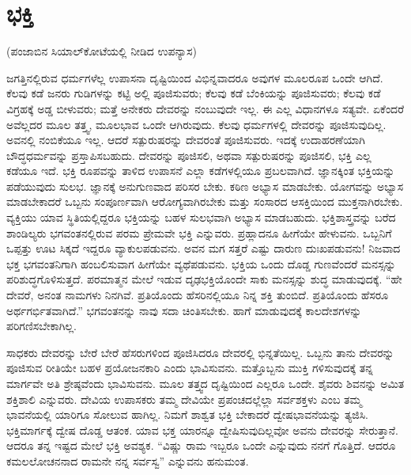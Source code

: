 
\chapter{ಭಕ್ತಿ}

\begin{center}
(ಪಂಜಾಬಿನ ಸಿಯಾಲ್​ಕೋಟೆಯಲ್ಲಿ ನೀಡಿದ ಉಪನ್ಯಾಸ)
\end{center}

ಜಗತ್ತಿನಲ್ಲಿರುವ ಧರ್ಮಗಳೆಲ್ಲ ಉಪಾಸನಾ ದೃಷ್ಟಿಯಿಂದ ವಿಭಿನ್ನವಾದರೂ ಅವುಗಳ ಮೂಲರೂಪ ಒಂದೇ ಆಗಿದೆ. ಕೆಲವು ಕಡೆ ಜನರು ಗುಡಿಗಳನ್ನು ಕಟ್ಟಿ ಅಲ್ಲಿ ಪೂಜಿಸುವರು; ಕೆಲವು ಕಡೆ ಬೆಂಕಿಯನ್ನು ಪೂಜಿಸುವರು; ಕೆಲವು ಕಡೆ ವಿಗ್ರಹಕ್ಕೆ ಅಡ್ಡ ಬೀಳುವರು; ಮತ್ತೆ ಅನೇಕರು ದೇವರನ್ನು ನಂಬುವುದೇ ಇಲ್ಲ. ಈ ಎಲ್ಲ ವಿಧಾನಗಳೂ ಸತ್ಯವೇ. ಏಕೆಂದರೆ ಅವೆಲ್ಲದರ ಮೂಲ ತತ್ತ್ವ, ಮೂಲಭಾವ ಒಂದೇ ಆಗಿರುವುದು. ಕೆಲವು ಧರ್ಮಗಳಲ್ಲಿ ದೇವರನ್ನು ಪೂಜಿಸುವುದಿಲ್ಲ. ಅವನಲ್ಲಿ ನಂಬಿಕೆಯೂ ಇಲ್ಲ. ಆದರೆ ಸತ್ಪುರುಷರನ್ನು ದೇವರಂತೆ ಪೂಜಿಸುವರು. ಇದಕ್ಕೆ ಉದಾಹರಣೆಯಾಗಿ ಬೌದ್ಧಧರ್ಮವನ್ನು ಪ್ರಸ್ತಾಪಿಸಬಹುದು. ದೇವರನ್ನು ಪೂಜಿಸಲಿ, ಅಥವಾ ಸತ್ಪುರುಷರನ್ನು ಪೂಜಿಸಲಿ, ಭಕ್ತಿ ಎಲ್ಲ ಕಡೆಯೂ ಇದೆ. ಭಕ್ತಿ ರೂಪವನ್ನು ತಾಳಿದ ಉಪಾಸನೆ ಎಲ್ಲಾ ಕಡೆಗಳಲ್ಲಿಯೂ ಪ್ರಬಲವಾಗಿದೆ. ಜ್ಞಾನಕ್ಕಿಂತ ಭಕ್ತಿಯನ್ನು ಪಡೆಯುವುದು ಸುಲಭ. ಜ್ಞಾನಕ್ಕೆ ಅನುಗುಣವಾದ ಪರಿಸರ ಬೇಕು. ಕಠಿಣ ಅಭ್ಯಾಸ ಮಾಡಬೇಕು. ಯೋಗವನ್ನು ಅಭ್ಯಾಸ ಮಾಡಬೇಕಾದರೆ ಒಬ್ಬನು ಸಂಪೂರ್ಣವಾಗಿ ಆರೋಗ್ಯವಾಗಿರಬೇಕು ಮತ್ತು ಸಂಸಾರದ ಆಸಕ್ತಿಯಿಂದ ಮುಕ್ತನಾಗಿರಬೇಕು. ವ್ಯಕ್ತಿಯು ಯಾವ ಸ್ಥಿತಿಯಲ್ಲಿದ್ದರೂ ಭಕ್ತಿಯನ್ನು ಬಹಳ ಸುಲಭವಾಗಿ ಅಭ್ಯಾಸ ಮಾಡಬಹುದು. ಭಕ್ತಿಶಾಸ್ತ್ರವನ್ನು ಬರೆದ ಶಾಂಡಿಲ್ಯರು ಭಗವಂತನಲ್ಲಿರುವ ಪರಮ ಪ್ರೇಮವೇ ಭಕ್ತಿ ಎನ್ನುವರು. ಪ್ರಹ್ಲಾದನೂ ಹೀಗೆಯೇ ಹೇಳುವನು. ಒಬ್ಬನಿಗೆ ಒಪ್ಪತ್ತು ಊಟ ಸಿಕ್ಕದೆ ಇದ್ದರೂ ವ್ಯಾಕುಲಪಡುವನು. ಅವನ ಮಗ ಸತ್ತರೆ ಎಷ್ಟು ದಾರುಣ ದುಃಖಪಡುವನು! ನಿಜವಾದ ಭಕ್ತ ಭಗವಂತನಿಗಾಗಿ ಹಂಬಲಿಸುವಾಗ ಹೀಗೆಯೇ ವ್ಯಥೆಪಡುವನು. ಭಕ್ತಿಯ ಒಂದು ದೊಡ್ಡ ಗುಣವೆಂದರೆ ಮನಸ್ಸನ್ನು ಪರಿಶುದ್ಧಗೊಳಿಸುತ್ತದೆ. ಪರಮಾತ್ಮನ ಮೇಲೆ ಇಡುವ ದೃಢಭಕ್ತಿಯೊಂದೇ ಸಾಕು ಮನಸ್ಸನ್ನು ಶುದ್ಧ ಮಾಡುವುದಕ್ಕೆ. “ಹೇ ದೇವರೆ, ಅನಂತ ನಾಮಗಳು ನಿನಗಿವೆ. ಪ್ರತಿಯೊಂದು ಹೆಸರಿನಲ್ಲಿಯೂ ನಿನ್ನ ಶಕ್ತಿ ತುಂಬಿದೆ. ಪ್ರತಿಯೊಂದು ಹೆಸರೂ ಅರ್ಥಗರ್ಭಿತವಾಗಿದೆ.” ಭಗವಂತನನ್ನು ನಾವು ಸದಾ ಚಿಂತಿಸಬೇಕು. ಹಾಗೆ ಮಾಡುವುದಕ್ಕೆ ಕಾಲದೇಶಗಳನ್ನು ಪರಿಗಣಿಸಬೇಕಾಗಿಲ್ಲ.

ಸಾಧಕರು ದೇವರನ್ನು ಬೇರೆ ಬೇರೆ ಹೆಸರುಗಳಿಂದ ಪೂಜಿಸಿದರೂ ದೇವರಲ್ಲಿ ಭಿನ್ನತೆಯಿಲ್ಲ. ಒಬ್ಬನು ತಾನು ದೇವರನ್ನು ಪೂಜಿಸುವ ರೀತಿಯೇ ಬಹಳ ಪ್ರಯೋಜನಕಾರಿ ಎಂದು ಭಾವಿಸುವನು. ಮತ್ತೊಬ್ಬನು ಮುಕ್ತಿ ಗಳಿಸುವುದಕ್ಕೆ ತನ್ನ ಮಾರ್ಗವೇ ಅತಿ ಶ್ರೇಷ್ಠವೆಂದು ಭಾವಿಸುವನು. ಮೂಲ ತತ್ತ್ವದ ದೃಷ್ಟಿಯಿಂದ ಎಲ್ಲರೂ ಒಂದೇ. ಶೈವರು ಶಿವನನ್ನು ಅಮಿತ ಶಕ್ತಿಶಾಲಿ ಎನ್ನುವರು. ದೇವಿಯ ಉಪಾಸಕರು ತಮ್ಮ ದೇವಿಯೇ ಪ್ರಪಂಚದಲ್ಲೆಲ್ಲಾ ಸರ್ವಶಕ್ತಳು ಎಂಬ ತಮ್ಮ ಭಾವನೆಯಲ್ಲಿ ಯಾರಿಗೂ ಸೋಲುವ ಹಾಗಿಲ್ಲ. ನಿಮಗೆ ಶಾಶ್ವತ ಭಕ್ತಿ ಬೇಕಾದರೆ ದ್ವೇಷಭಾವನೆಯನ್ನು ತ್ಯಜಿಸಿ. ಭಕ್ತಿಮಾರ್ಗಕ್ಕೆ ದ್ವೇಷ ದೊಡ್ಡ ಆತಂಕ. ಯಾವ ಭಕ್ತ ಯಾರನ್ನೂ ದ್ವೇಷಿಸುವುದಿಲ್ಲವೋ ಅವನು ದೇವರನ್ನು ಸೇರುತ್ತಾನೆ. ಆದರೂ ತನ್ನ ಇಷ್ಟದ ಮೇಲೆ ಭಕ್ತಿ ಅವಶ್ಯಕ. “ವಿಷ್ಣು ರಾಮ ಇಬ್ಬರೂ ಒಂದೇ ಎನ್ನುವುದು ನನಗೆ ಗೊತ್ತಿದೆ. ಆದರೂ ಕಮಲಲೋಚನನಾದ ರಾಮನೇ ನನ್ನ ಸರ್ವಸ್ವ” ಎನ್ನುವನು ಹನುಮಂತ.

